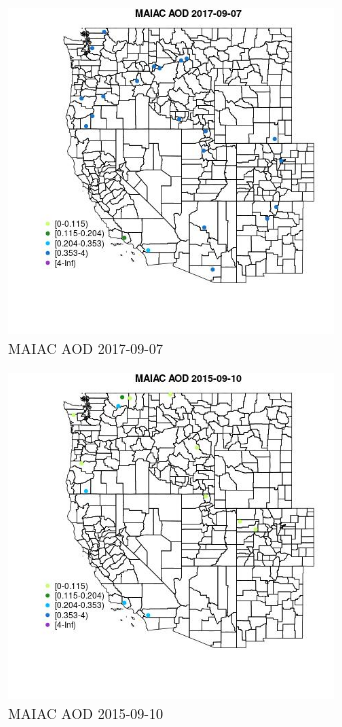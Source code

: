 \begin{figure} 
\centering  
\includegraphics[width=0.77\textwidth]{Code_Outputs/Report_ML_input_PM25_Step4_part_e_de_duplicated_aveswNAs_MapObsMAIAC_AOD2017-09-07.jpg} 
\caption{\label{fig:Report_ML_input_PM25_Step4_part_e_de_duplicated_aveswNAsMapObsMAIAC_AOD2017-09-07}MAIAC AOD 2017-09-07} 
\end{figure} 
 

\begin{figure} 
\centering  
\includegraphics[width=0.77\textwidth]{Code_Outputs/Report_ML_input_PM25_Step4_part_e_de_duplicated_aveswNAs_MapObsMAIAC_AOD2015-09-10.jpg} 
\caption{\label{fig:Report_ML_input_PM25_Step4_part_e_de_duplicated_aveswNAsMapObsMAIAC_AOD2015-09-10}MAIAC AOD 2015-09-10} 
\end{figure} 
 

